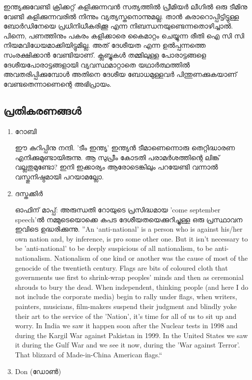 ഇന്ത്യക്കുവേണ്ടി ക്രിക്കറ്റ് കളിക്കുന്നവന്‍ സത്യത്തില്‍ പ്രീമിയര്‍ ലീഗില്‍ ഒരു ടീമിനു വേണ്ടി കളിക്കുന്നവരില്‍ നിന്നും 
വ്യത്യസ്തനൊന്നുമല്ല. താന്‍ കരാറൊപ്പിട്ടിട്ടുള്ള ബോര്‍ഡിനേയെ പ്രധിനിധീകരിക്കൂ എന്ന നിബന്ധനയുണ്ടെന്നതൊഴിച്ചാല്‍. 
പിന്നെ, പണത്തിനും പകരം കളിക്കാരെ കൈമാറ്റം ചെയ്യുന്ന രീതി ഐ സി സി നിയമവിധേയമാക്കിയിട്ടുമില്ല. 
അത് ദേശീയത എന്ന ഉല്‍പ്പന്നത്തെ സംരക്ഷിക്കാന്‍ വേണ്ടിയാണ്. ക്ലബ്ബുകള്‍ തമ്മിലുള്ള പോരാട്ടങ്ങളെ 
ദേശീയപോരാട്ടങ്ങളായി വ്യവസ്ഥമാറ്റാതെ യഥാര്‍ത്ഥത്തില്‍ അവതരിപ്പിക്കുമ്പോള്‍ അതിനെ ദേശീയ ബോധമുള്ളവര്‍ 
പിന്തുണക്കുകയാണ് വേണ്ടതെന്നാണെന്റെ അഭിപ്രായം.

\subsection*{പ്രതികരണങ്ങള്‍}
\begin{enumerate}
 \item{റോബി}

ഈ കുറിപ്പിനു നന്ദി. 'ടീം ഇന്ത്യ' ഇന്ത്യന്‍ ടീമാണെന്നൊരു തെറ്റിദ്ധാരണ എനിക്കുമുണ്ടായിരുന്നു. 
ആ സുപ്രീം കോടതി പരാമര്‍ശത്തിന്റെ ലിങ്ക് വല്ലതുമുണ്ടോ? ഇനി ഇക്കാര്യം ആരോടെങ്കിലും 
പറയേണ്ടി വന്നാല്‍ വസ്തുനിഷ്ഠമായി പറയാമല്ലോ.

 \item{ദസ്തക്കിര്‍}

ഓഫിന് മാപ്പ്: അരുന്ധതി റോയുടെ പ്രസിദ്ധമായ 'come september speech'ല്‍ നമ്മുടെയൊക്കെ കപട 
ദേശീയതയെക്കുറിച്ചുള്ള ഒരു പ്രസ്ഥാവന ഇവിടെ ഉദ്ധരിക്കുന്നു. ''An ‘anti-national' is a person who is against his/her 
own nation and, by inference, is pro some other one. But it isn’t necessary to be 'anti-national' 
to be deeply suspicious of all nationalism, to be anti-nationalism. Nationalism of one kind or 
another was the cause of most of the genocide of the twentieth century. 
Flags are bits of coloured cloth that governments use first to shrink-wrap peoples' 
minds and then as ceremonial shrouds to bury the dead. When independent, thinking people 
(and here I do not include the corporate media) begin to rally under flags, when writers, 
painters, musicians, film-makers suspend their judgment and blindly yoke their art to the service of the 'Nation', 
it’s time for all of us to sit up and worry. In India we saw it happen soon after the Nuclear tests in 
1998 and during the Kargil War against Pakistan in 1999. In the United States we saw it during 
the Gulf War and we see it now, during the 'War against Terror'. 
That blizzard of Made-in-China American flags.``

 \item{Don (ഡോണ്‍)}


\end{enumerate}
